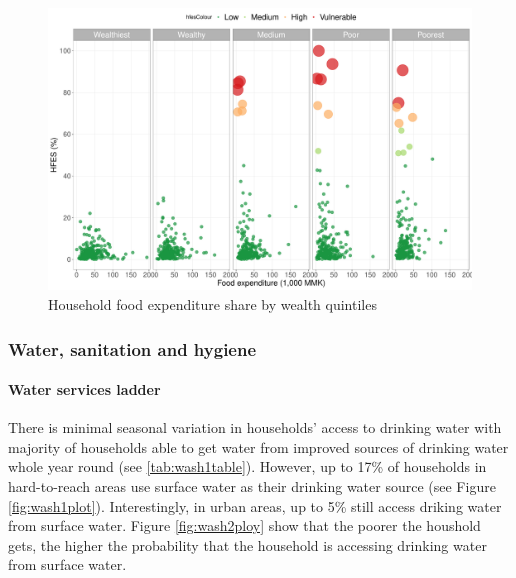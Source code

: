 \documentclass[12pt,a4paper]{article}
\let\oldparagraph\paragraph
\renewcommand{\paragraph}[1]{\oldparagraph{#1}\mbox{}}
\begin{document}
\begin{figure}[H]

{\centering \includegraphics{kayinReport_files/figure-latex/hfesScatterPlot2-1} 

}

\caption{Household food expenditure share by wealth quintiles}\label{fig:hfesScatterPlot2}
\end{figure}

\hypertarget{wash-results}{%
\subsubsection{Water, sanitation and hygiene}\label{wash-results}}

\hypertarget{water-results}{%
\paragraph{Water services ladder}\label{water-results}}

There is minimal seasonal variation in households' access to drinking water with majority of households able to get water from improved sources of drinking water whole year round (see \ref{tab:wash1table}). However, up to 17\% of households in hard-to-reach areas use surface water as their drinking water source (see Figure \ref{fig:wash1plot}). Interestingly, in urban areas, up to 5\% still access driking water from surface water. Figure \ref{fig:wash2ploy} show that the poorer the houshold gets, the higher the probability that the household is accessing drinking water from surface water.
\end{document}

